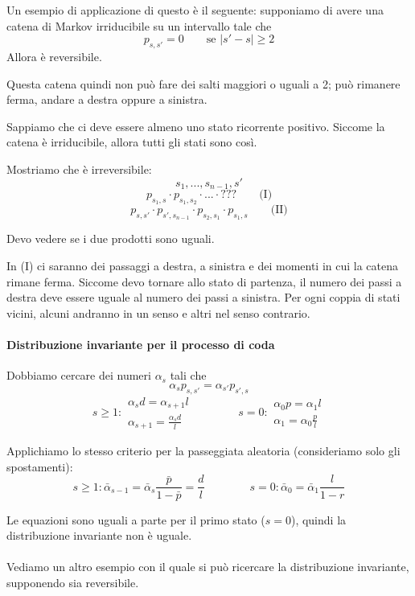 \documentclass[a4paper,12pt]{book}
\newcommand\ddfrac[2]{\frac{\displaystyle #1}{\displaystyle #2}}
\begin{document}
Un esempio di applicazione di questo è il seguente: supponiamo di avere una catena di Markov irriducibile su un intervallo tale che
$$ p_{s,s'} = 0 \qquad \text{se } | s' - s | \ge 2 $$
Allora è reversibile. 



Questa catena quindi non può fare dei salti maggiori o uguali a 2; può rimanere ferma, andare a destra oppure a sinistra. 

Sappiamo che ci deve essere almeno uno stato ricorrente positivo. Siccome la catena è irriducibile, allora tutti gli stati sono così. 

Mostriamo che è irreversibile:
$$ s_1, ..., s_{n-1}, s' $$
$$ p_{s_1, s} \cdot p_{s_1, s_2} \cdot ... \cdot ??? \qquad \text{(I)}$$ %
$$ p_{s,s'} \cdot p_{s', s_{n-1}} \cdot p_{s_2, s_1} \cdot p_{s_1, s} \qquad \text{(II)}$$

Devo vedere se i due prodotti sono uguali. 

In (I) ci saranno dei passaggi a destra, a sinistra e dei momenti in cui la catena rimane ferma. Siccome devo tornare allo stato di partenza, il numero dei passi a destra deve essere uguale al numero dei passi a sinistra. Per ogni coppia di stati vicini, alcuni andranno in un senso e altri nel senso contrario. 

\paragraph{Distribuzione invariante per il processo di coda} Dobbiamo cercare dei numeri $ \alpha_s $ tali che 
$$ \alpha_{s}p_{s,s'} = \alpha_{s'}p_{s',s} $$
$$ s \ge 1: \begin{array}{c}
	\alpha_{s}d = \alpha_{s+1}l \\
	\alpha_{s+1} = \ddfrac{\alpha_{s}d}{l}
\end{array} \qquad \qquad s = 0: \begin{array}{c}
	\alpha_{0}p = \alpha_{1} l \\
	\alpha_{1} = \alpha_{0}\ddfrac{p}{l}
\end {array} $$

Applichiamo lo stesso criterio per la passeggiata aleatoria (consideriamo solo gli spostamenti):
$$ s \ge 1: 
	\bar{\alpha}_{s-1} = \bar{\alpha}_s \ddfrac{\bar{p}}{1-\bar{p}} = \ddfrac{d}{l}
	\qquad \qquad s = 0: 
	\bar{\alpha}_{0} = \bar{\alpha}_{1} \ddfrac{l}{1-r}
$$

Le equazioni sono uguali a parte per il primo stato ($ s=0 $), quindi la distribuzione invariante non è uguale. 
\\
\\
Vediamo un altro esempio con il quale si può ricercare la distribuzione invariante, supponendo sia reversibile. 
\end{document}
